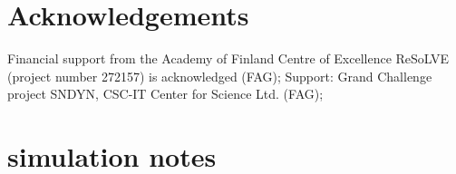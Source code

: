 \documentclass[iop,apj,numberedappendix,twocolappendix]{emulateapj}
\begin{document}
\section*{Acknowledgements}
  Financial support from the Academy of Finland Centre of Excellence ReSoLVE 
  (project number 272157) is acknowledged (FAG); 
  Support: Grand Challenge project SNDYN, CSC-IT Center for Science Ltd. (FAG); 

{}

\newpage 

\appendix

\section*{simulation notes}
\end{document}
